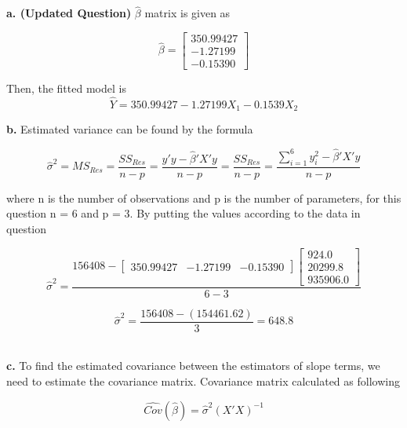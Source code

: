 \documentclass{article}
\begin{document}
\textbf{a. (Updated Question)} $\hat{\beta}$ matrix is given as

\begin{equation}
    \hat{\beta} = 
    \begin{bmatrix}
    350.99427 \\
    -1.27199 \\
    -0.15390
    \end{bmatrix}
\end{equation}

Then, the fitted model is
\begin{equation}
     \hat{Y} = 350.99427 - 1.27199X_1 - 0.1539X_2
\end{equation}

\newpage
\textbf{b.} Estimated variance can be found by the formula

\begin{equation}
    {\hat{\sigma}}^2 = MS_{Res} = \frac{SS_{Res}}{n-p} = \frac{y'y - \hat{\beta}'X'y}{n-p} = \frac{SS_{Res}}{n-p} = \frac{\sum_{i=1}^{6} y_i^2 - \hat{\beta}'X'y}{n-p}
\end{equation}

where n is the number of observations and p is the number of parameters, for this question n = 6 and p = 3. By putting the values according to the data in question

\begin{equation}
\hat{\sigma}^2 = \frac{156408
    -\begin{bmatrix} 
    350.99427  & -1.27199 & -0.15390
    \end{bmatrix} 
    \begin{bmatrix} 
    924.0 \\
    20299.8 \\
    935906.0
    \end{bmatrix}}{6-3}
\end{equation}

\begin{equation}
    \hat{\sigma}^2 = \frac{156408-(154461.62)}{3} = 648.8
\end{equation}

\\

\textbf{c.}
To find the estimated covariance between the estimators of slope terms, we need to estimate the covariance matrix. Covariance matrix calculated as following

\begin{equation}
    \hat{Cov}(\hat{\beta}) = \hat{\sigma}^2(X'X)^{-1}
\end{equation}
\end{document}
